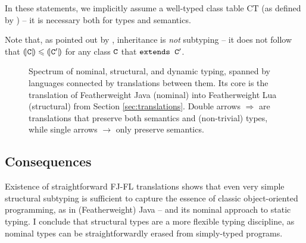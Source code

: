In these statements, we implicitly assume a well-typed class table $\mathrm{CT}$ (as defined by \textcite{featherweight-java}) -- it is necessary both for types and semantics.

Note that, as pointed out by \textcite{inheritance-subtyping}, inheritance is \emph{not} subtyping -- it does not follow that $\denoty{\fj C} \sub \denoty {\fj C'}$ for any class $\texttt{C}$ that $\texttt{extends C}'$.

\begin{figure}[t]
    \centering
    \caption{Spectrum of nominal, structural, and dynamic typing, spanned by languages connected by translations between them. Its core is the translation of Featherweight Java (nominal) into Featherweight Lua (structural) from Section \ref{sec:translations}. Double arrows $\Rightarrow$ are translations that preserve both semantics and (non-trivial) types, while single arrows $\to$ only preserve semantics.}
    \label{fig:nominal-structural-dynamic}
\end{figure}

\subsection{Consequences}

Existence of straightforward FJ-FL translations shows that even very simple structural subtyping is sufficient to capture the essence of classic object-oriented programming, as in (Featherweight) Java -- and its nominal approach to static typing.
I conclude that structural types are a more flexible typing discipline, as nominal types can be straightforwardly erased from simply-typed programs.

